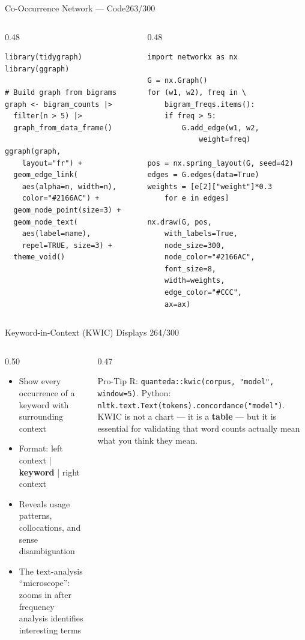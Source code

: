 \documentclass[10pt]{beamer}
\newcommand{\smark}[1]{\hfill{\scriptsize\color{codegray}#1}}
\begin{document}
\begin{frame}[fragile]{Co-Occurrence Network --- Code}\smark{263/300}
\begin{columns}[T]
\begin{column}{0.48\textwidth}
\begin{lstlisting}[style=Rstyle]
library(tidygraph)
library(ggraph)

# Build graph from bigrams
graph <- bigram_counts |>
  filter(n > 5) |>
  graph_from_data_frame()

ggraph(graph,
    layout="fr") +
  geom_edge_link(
    aes(alpha=n, width=n),
    color="#2166AC") +
  geom_node_point(size=3) +
  geom_node_text(
    aes(label=name),
    repel=TRUE, size=3) +
  theme_void()
\end{lstlisting}
\end{column}
\begin{column}{0.48\textwidth}
\begin{lstlisting}[style=Pystyle]
import networkx as nx

G = nx.Graph()
for (w1, w2), freq in \
    bigram_freqs.items():
    if freq > 5:
        G.add_edge(w1, w2,
            weight=freq)

pos = nx.spring_layout(G, seed=42)
edges = G.edges(data=True)
weights = [e[2]["weight"]*0.3
    for e in edges]

nx.draw(G, pos,
    with_labels=True,
    node_size=300,
    node_color="#2166AC",
    font_size=8,
    width=weights,
    edge_color="#CCC",
    ax=ax)
\end{lstlisting}
\end{column}
\end{columns}
\end{frame}

\begin{frame}{Keyword-in-Context (KWIC) Displays}
\smark{264/300}
\begin{columns}[T]
\begin{column}{0.50\textwidth}
\begin{itemize}
    \item Show every occurrence of a keyword with surrounding context
    \item Format: left context | \textbf{keyword} | right context
    \item Reveals usage patterns, collocations, and sense disambiguation
    \item The text-analysis ``microscope'': zooms in after frequency analysis identifies interesting terms
\end{itemize}
\end{column}
\begin{column}{0.47\textwidth}
\begin{alertblock}{Pro-Tip}
    \scriptsize R: \texttt{quanteda::kwic(corpus, "model", window=5)}. Python: \texttt{nltk.text.Text(tokens).concordance("model")}. KWIC is not a chart --- it is a \textbf{table} --- but it is essential for validating that word counts actually mean what you think they mean.
\end{alertblock}
\end{column}
\end{columns}
\end{frame}
\end{document}
